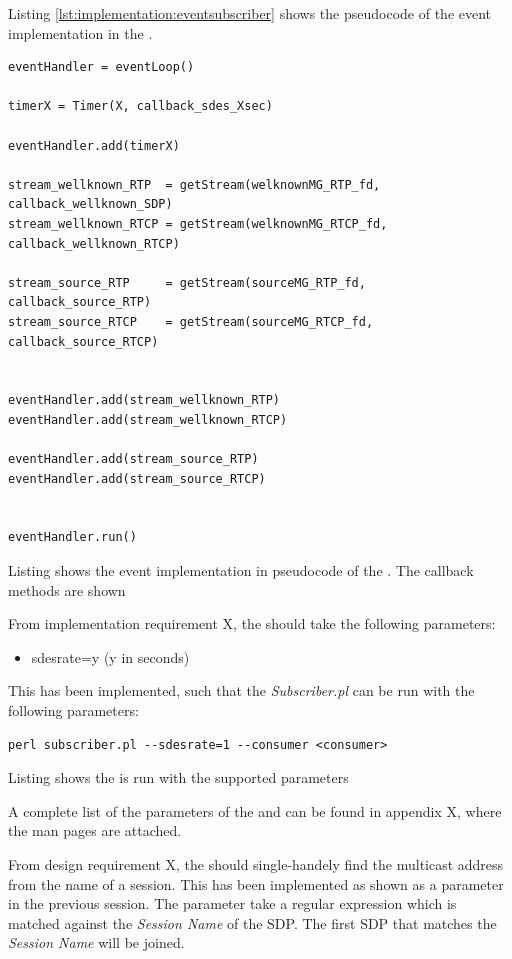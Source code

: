 Listing \ref{lst:implementation:eventsubscriber} shows the pseudocode of the event implementation in the \sub{}.
\begin{listing}[H] 
\begin{verbatim}
eventHandler = eventLoop()
	
timerX = Timer(X, callback_sdes_Xsec)
	
eventHandler.add(timerX)
	
stream_wellknown_RTP  = getStream(welknownMG_RTP_fd, callback_wellknown_SDP)
stream_wellknown_RTCP = getStream(welknownMG_RTCP_fd, callback_wellknown_RTCP)

stream_source_RTP     = getStream(sourceMG_RTP_fd, callback_source_RTP)
stream_source_RTCP    = getStream(sourceMG_RTCP_fd, callback_source_RTCP)


eventHandler.add(stream_wellknown_RTP)
eventHandler.add(stream_wellknown_RTCP)

eventHandler.add(stream_source_RTP)
eventHandler.add(stream_source_RTCP)

	
eventHandler.run()
\end{verbatim}
\caption{Listing shows the event implementation in pseudocode of the \pub{}. The callback methods are shown}
\label{lst:implementation:eventsubscriber}
\end{listing}

From implementation requirement X, the \sub{} should take the following parameters:

\begin{itemize}
	\item sdesrate=y (y in seconds)
\end{itemize}

This has been implemented, such that the \textit{Subscriber.pl} can be run with the following parameters:
\begin{listing}[h] 
\begin{verbatim}
perl subscriber.pl --sdesrate=1 --consumer <consumer>
\end{verbatim}
\caption{Listing shows the \sub{} is run with the supported parameters}
\label{lst:implementation:parameterspublisher}
\end{listing}


\noindent{}A complete list of the parameters of the \pub{} and \sub{} can be found in appendix X, where the man pages are attached.

From design requirement X, the \sub{} should single-handely find the multicast address from the name of a session. This has been implemented as shown as a parameter in the previous session. The parameter take a regular expression which is matched against the \textit{Session Name} of the SDP. The first SDP that matches the \textit{Session Name} will be joined.


